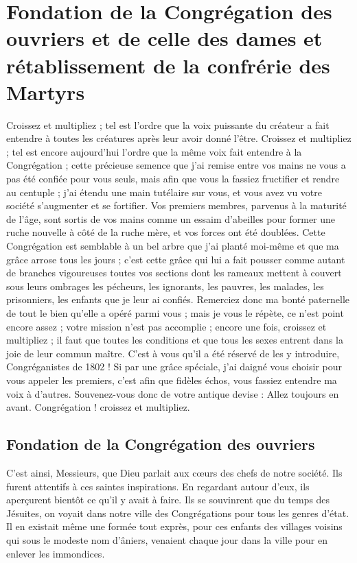 \chapter{Fondation de la Congrégation des ouvriers et de celle des dames et rétablissement de la confrérie des Martyrs}

Croissez et multipliez ; tel est l'ordre que la voix puissante du créateur a fait entendre à toutes les créatures après leur avoir donné l'être. Croissez et multipliez ; tel est encore aujourd'hui l'ordre que la même voix fait entendre à la Congrégation ; cette précieuse semence que j'ai remise entre vos mains ne vous a pas été confiée pour vous seuls, mais afin que vous la fassiez fructifier
et rendre au centuple ; j'ai étendu une main tutélaire sur vous, et vous avez vu votre société s'augmenter et se fortifier. Vos premiers membres, parvenus à la maturité de l'âge, sont sortis de vos mains comme un essaim d'abeilles pour former une ruche nouvelle à côté de la ruche mère, et vos forces ont été doublées. Cette Congrégation est semblable à un bel arbre que j'ai planté moi-même et que ma grâce arrose tous les jours ; c'est cette grâce qui lui a fait pousser comme autant de branches vigoureuses toutes vos sections dont les rameaux mettent à couvert sous leurs ombrages les pécheurs, les ignorants, les pauvres, les malades, les prisonniers, les enfants que je leur ai confiés. Remerciez donc ma bonté paternelle de tout le bien qu'elle a opéré parmi vous ; mais je vous le répète, ce n'est point encore assez ; votre mission n'est pas accomplie ; encore une fois, croissez et multipliez ; il faut que toutes les conditions et que tous les sexes entrent dans la joie de leur commun maître. C'est à vous qu'il a été réservé de les y introduire, Congréganistes de 1802 ! Si par une grâce spéciale, j'ai daigné vous choisir pour vous appeler les premiers, c'est afin que fidèles échos, vous fassiez entendre ma voix à d'autres. Souvenez-vous donc de votre antique devise : Allez toujours en avant. Congrégation ! croissez et multipliez.

\section*{Fondation de la Congrégation des ouvriers}
C'est ainsi, Messieurs, que Dieu parlait aux cœurs des chefs de notre société. Ils furent attentifs à ces saintes inspirations. En regardant autour d'eux, ils aperçurent bientôt ce qu'il y avait à faire. Ils se souvinrent que du temps des Jésuites, on voyait dans notre ville des Congrégations pour tous les genres d'état. Il en existait même une formée tout exprès, pour ces enfants
des villages voisins qui sous le modeste nom d'âniers, venaient chaque jour dans la ville pour en enlever les immondices.

